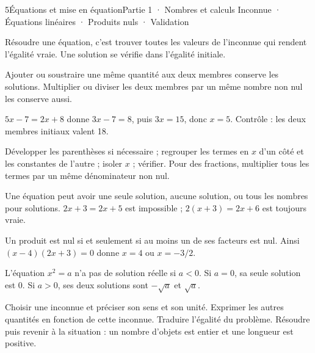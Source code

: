 \begin{ouverture}[courbe]{5}{Équations et mise en équation}{Partie 1 · Nombres et calculs}
{Inconnue · Équations linéaires · Produits nuls · Validation}
\end{ouverture}
\pagestyle{otMain}\essentiel\fontsize{11}{15}\selectfont
{}
\begin{definition}Résoudre une équation, c’est trouver toutes les valeurs de l’inconnue qui rendent l’égalité vraie. Une solution se vérifie dans l’égalité initiale.\end{definition}
\begin{propriete}Ajouter ou soustraire une même quantité aux deux membres conserve les solutions. Multiplier ou diviser les deux membres par un même nombre non nul les conserve aussi.\end{propriete}
\begin{exemple}$5x-7=2x+8$ donne $3x-7=8$, puis $3x=15$, donc $x=5$. Contrôle : les deux membres initiaux valent 18.\end{exemple}
\begin{savoirfaire}Développer les parenthèses si nécessaire ; regrouper les termes en $x$ d’un côté et les constantes de l’autre ; isoler $x$ ; vérifier. Pour des fractions, multiplier tous les termes par un même dénominateur non nul.\end{savoirfaire}
\begin{attention}Une équation peut avoir une seule solution, aucune solution, ou tous les nombres pour solutions. $2x+3=2x+5$ est impossible ; $2(x+3)=2x+6$ est toujours vraie.\end{attention}
\clearpage
{}
\begin{propriete}Un produit est nul si et seulement si au moins un de ses facteurs est nul. Ainsi $(x-4)(2x+3)=0$ donne $x=4$ ou $x=-3/2$.\end{propriete}
\begin{propriete}L’équation $x^2=a$ n’a pas de solution réelle si $a<0$. Si $a=0$, sa seule solution est 0. Si $a>0$, ses deux solutions sont $-\sqrt a$ et $\sqrt a$.\end{propriete}
\begin{savoirfaire}Choisir une inconnue et préciser son sens et son unité. Exprimer les autres quantités en fonction de cette inconnue. Traduire l’égalité du problème. Résoudre puis revenir à la situation : un nombre d’objets est entier et une longueur est positive.\end{savoirfaire}

